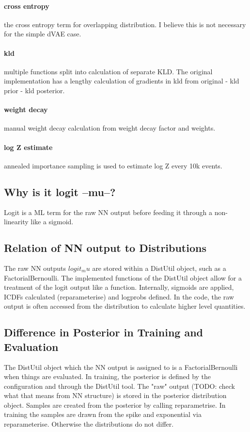 \paragraph{cross entropy} the cross entropy term for overlapping distribution. I
believe this is not necessary for the simple dVAE case. \paragraph{kld} multiple
functions split into calculation of separate KLD. The original implementation
has a lengthy calculation of gradients in kld from original - kld prior  - kld
posterior. \paragraph{weight decay} manual weight decay calculation from weight
decay factor and weights. \paragraph{log Z estimate} annealed importance
sampling is used to estimate log Z every 10k events. 

\subsection{Why is it logit --mu--?}
Logit is a ML term for the raw NN output before feeding it through a
non-linearity like a sigmoid. 

\subsection{Relation of NN output to Distributions}
The raw NN outputs $logit_mu$ are stored within a DistUtil object, such as a
FactorialBernoulli. The implemented functions of the DistUtil object allow for a
treatment of the logit output like a function. Internally, sigmoids are applied,
ICDFs calculated (reparameterise) and logprobs defined. In the code, the raw
output is often accessed from the distribution to calculate higher level
quantities.

\subsection{Difference in Posterior in Training and Evaluation}
The DistUtil object which the NN output is assigned to is a FactorialBernoulli
when things are evaluated. In training, the posterior is defined by the
configuration and through the DistUtil tool. The "raw" output (TODO: check what
that means from NN structure) is stored in the posterior distribution object.
Samples are created from the posterior by calling reparametrise. In training the
samples are drawn from the spike and exponential via reparameterise. Otherwise
the distributions do not differ. 


